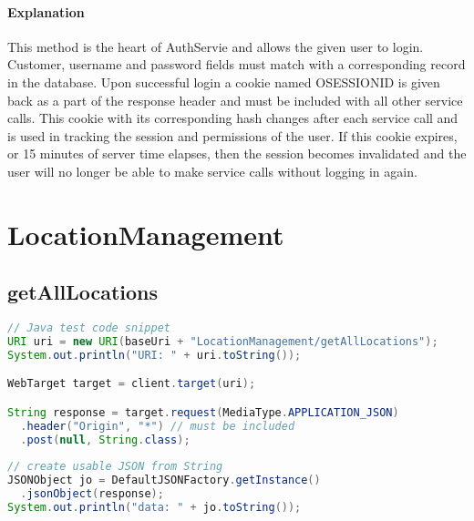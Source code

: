 \documentclass[
10pt, %
letterpaper, %
oneside, %
headinclude,footinclude, %
BCOR5mm, %
]{scrartcl}
\begin{document}
\paragraph{Explanation} This method is the heart of AuthServie and allows the given user to login. Customer, username and password fields must match with a corresponding record in the database. Upon successful login a cookie named OSESSIONID is given back as a part of the response header and must be included with all other service calls. This cookie with its corresponding hash changes after each service call and is used in tracking the session and permissions of the user. If this cookie expires, or 15 minutes of server time elapses, then the session becomes invalidated and the user will no longer be able to make service calls without logging in again.



\section{LocationManagement}


\subsection{\textbf{getAllLocations}}
\begin{lstlisting}[language=Java]
// Java test code snippet
URI uri = new URI(baseUri + "LocationManagement/getAllLocations");
System.out.println("URI: " + uri.toString());

WebTarget target = client.target(uri);

String response = target.request(MediaType.APPLICATION_JSON)
  .header("Origin", "*") // must be included
  .post(null, String.class);
  
// create usable JSON from String
JSONObject jo = DefaultJSONFactory.getInstance()
  .jsonObject(response);
System.out.println("data: " + jo.toString());
\end{lstlisting}

\end{document}
